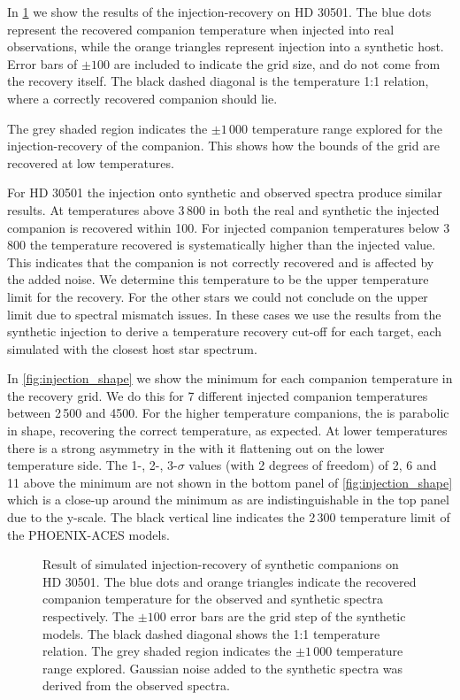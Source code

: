In \cref{fig:injection-recovery} we show the results of the injection-recovery on {HD 30501}.
The blue dots represent the recovered companion temperature when injected into real observations, while the orange triangles represent injection into a synthetic host.
Error bars of \(\pm100\)\K{} are included to indicate the grid size, and do not come from the recovery itself.
The black dashed diagonal is the temperature 1:1 relation, where a correctly recovered companion should lie.

The grey shaded region indicates the \(\pm1\,000\)\K{} temperature range explored for the injection-recovery of the companion.
This shows how the bounds of the grid are recovered at low temperatures.

For {HD 30501} the injection onto synthetic and observed spectra produce similar results.
At temperatures above 3\,800\K{} in both the real and synthetic the injected companion is recovered within 100\K{}.
For injected companion temperatures below 3\,800\K{} the temperature recovered is systematically higher than the injected value.
This indicates that the companion is not correctly recovered and is affected by the added noise.
We determine this temperature to be the upper temperature limit for the recovery.
For the other stars we could not conclude on the upper limit due to spectral mismatch issues.
In these cases we use the results from the synthetic injection to derive a temperature recovery cut-off for each target, each simulated with the closest host star spectrum.

In \cref{fig:injection_shape} we show the minimum \textchisquared{} for each companion temperature in the recovery grid.
We do this for 7 different injected companion temperatures between 2\,500 and 4500\K{}.
For the higher temperature companions, the \textchisquared{} is parabolic in shape, recovering the correct temperature, as expected.
At lower temperatures there is a strong asymmetry in the \textchisquared{} with it flattening out on the lower temperature side.
The 1-, 2-, 3-\(\sigma\) values (with 2 degrees of freedom) of 2, 6 and 11 above the minimum \textchisquared{} are not shown in the bottom panel of \cref{fig:injection_shape} which is a close-up around the minimum \textchisquared{} as are indistinguishable in the top panel due to the \textchisquared{} y-scale.
The black vertical line indicates the 2\,300\K{} temperature limit of the {PHOENIX-ACES} models.

\begin{figure}
    \centering
    \caption{Result of simulated injection-recovery of synthetic companions on {HD 30501}.
The blue dots and orange triangles indicate the recovered companion temperature for the observed and synthetic spectra respectively.
The \(\pm100\)\K{} error bars are the grid step of the synthetic models.
The black dashed diagonal shows the 1:1 temperature relation.
The grey shaded region indicates the \(\pm1\,000\)\K{} temperature range explored.
Gaussian noise added to the synthetic spectra was derived from the observed spectra.}
    \label{fig:injection-recovery}
\end{figure}


